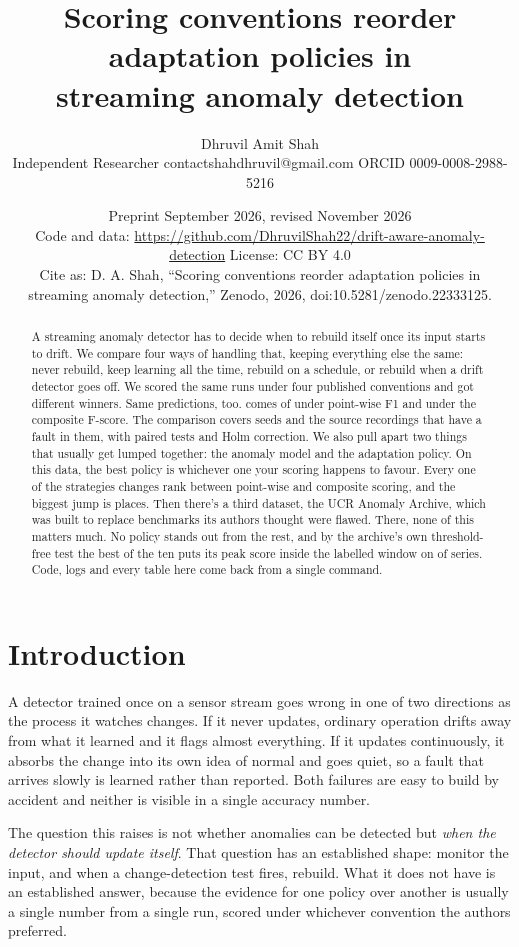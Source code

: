\documentclass[11pt,a4paper]{article}
\title{Scoring conventions reorder adaptation policies in\\ streaming anomaly detection}
\author{%
  Dhruvil Amit Shah\\
  {\normalsize Independent Researcher \textperiodcentered{} contactshahdhruvil@gmail.com \textperiodcentered{} ORCID 0009-0008-2988-5216}
}
\date{Preprint \textperiodcentered{} September 2026, revised November 2026\\[2pt]
\small Code and data: \url{https://github.com/DhruvilShah22/drift-aware-anomaly-detection} \textperiodcentered{} License: CC BY 4.0\\
Cite as: D. A. Shah, ``Scoring conventions reorder adaptation policies in streaming anomaly detection,'' Zenodo, 2026, doi:10.5281/zenodo.22333125.}
\begin{document}
\maketitle

\begin{abstract}
A streaming anomaly detector has to decide when to rebuild itself once its input
starts to drift. We compare four ways of handling that, keeping everything else the
same: never rebuild, keep learning all the time, rebuild on a schedule, or rebuild
when a drift detector goes off. We scored the same runs under four published
conventions and got \NDistinctWinners{} different winners. Same predictions, too.
\MoverName{} comes \MoverPointRank{} of \NStrategies{} under point-wise F1 and
\MoverCompositeRank{} under the composite F-score. The comparison covers \NSeeds{}
seeds and the \NRecordings{} source recordings that have a fault in them, with paired
tests and Holm correction. We also pull apart two things that usually get lumped
together: the anomaly model and the adaptation policy. On this data, the best policy
is whichever one your scoring happens to favour. Every one of the \NStrategies{}
strategies changes rank between point-wise and composite scoring, and the biggest
jump is \MaxRankJump{} places. Then there's a third dataset, the UCR Anomaly Archive,
which was built to replace benchmarks its authors thought were flawed. There, none of
this matters much. No policy stands out from the rest, and by the archive's own
threshold-free test the best of the ten puts its peak score inside the labelled window
on \BestUcrTopOneVal{} of series. Code, logs and every table here come back from a
single command.
\end{abstract}

\section{Introduction}

A detector trained once on a sensor stream goes wrong in one of two directions
as the process it watches changes. If it never updates, ordinary operation
drifts away from what it learned and it flags almost everything. If it updates
continuously, it absorbs the change into its own idea of normal and goes quiet,
so a fault that arrives slowly is learned rather than reported. Both failures
are easy to build by accident and neither is visible in a single accuracy
number.

The question this raises is not whether anomalies can be detected but
\emph{when the detector should update itself}. That question has an established
shape: monitor the input, and when a change-detection test fires, rebuild. What
it does not have is an established answer, because the evidence for one policy
over another is usually a single number from a single run, scored under
whichever convention the authors preferred.
\end{document}

